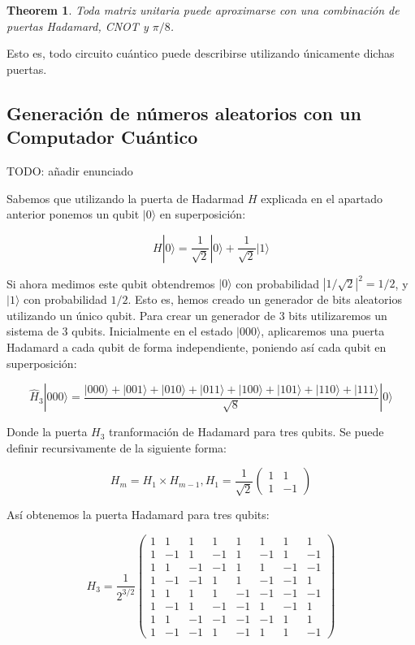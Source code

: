 \documentclass[11pt]{article}
\newtheorem{theorem}{Theorem}
\newcommand{\ra}{\rangle}
\begin{document}
\begin{theorem}
	Toda matriz unitaria puede aproximarse con una combinación de puertas Hadamard, CNOT y $\pi/8$.
\end{theorem}

Esto es, todo circuito cuántico puede describirse utilizando únicamente dichas puertas.

\subsection{Generación de números aleatorios con un Computador Cuántico}

TODO: añadir enunciado

Sabemos que utilizando la puerta de Hadarmad $H$ explicada en el apartado anterior ponemos un qubit $|0\ra$ en superposición:

\[
	H|0\ra = \frac{1}{\sqrt 2} |0\ra + \frac{1}{\sqrt 2} |1\ra
\]

Si ahora medimos este qubit obtendremos $|0\ra$ con probabilidad $|1/\sqrt 2|^2 = 1/2$, y $|1\ra$ con probabilidad $1/2$. Esto es, hemos creado un generador de bits aleatorios utilizando un único qubit. Para crear un generador de 3 bits utilizaremos un sistema de 3 qubits. Inicialmente en el estado $|000\ra$, aplicaremos una puerta Hadamard a cada qubit de forma independiente, poniendo así cada qubit en superposición:

\[
	\hat H_3|000\ra = \frac{|000\ra + |001\ra + |010\ra + |011\ra + |100\ra + |101\ra + |110\ra + |111\ra}{\sqrt 8} |0\ra
\]

Donde la puerta $H_3$ tranformación de Hadamard para tres qubits. Se puede definir recursivamente de la siguiente forma:

\[
	H_m = H_1 \times H_{m-1}, H_1 = \frac{1}{\sqrt 2}
	\begin{pmatrix}
		1 & 1 \\
		1 & -1 
	\end{pmatrix}
\]

Así obtenemos la puerta Hadamard para tres qubits:

\[
	H_3 = \frac{1}{2^{3/2}}
	\begin{pmatrix}
		1 & 1 & 1 & 1 & 1 & 1 & 1 & 1 \\
		1 & -1 & 1 & -1 & 1 & -1 & 1 & -1 \\
		1 & 1 & -1 & -1 & 1 & 1 & -1 & -1 \\
		1 & -1 & -1 & 1 & 1 & -1 & -1 & 1 \\
		1 & 1 & 1 & 1 & -1 & -1 & -1 & -1 \\
		1 & -1 & 1 & -1 & -1 & 1 & -1 & 1 \\
		1 & 1 & -1 & -1 & -1 & -1 & 1 & 1 \\
		1 & -1 & -1 & 1 & -1 & 1 & 1 & -1
	\end{pmatrix}
\]
\end{document}
